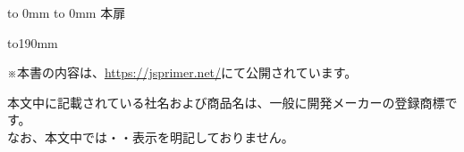 \begin{comment}
%
%
\end{comment}

\thispagestyle{empty} \vbox to 0mm{\vspace*{-27.5truemm} \hbox to 0mm{
}\vss} 本扉 \pagebreak


\begin{comment}
%
%
\end{comment}

\thispagestyle{frontheadings}

\vbox to190mm{ \vfil
\begin{minipage}[b]{112mm}
%
\begin{spacing}{1.0}
※本書の内容は、\url{https://jsprimer.net/}にて公開されています。

\begin{small}
本文中に記載されている社名および商品名は、一般に開発メーカーの登録商標です。\\
なお、本文中では\texttrademark ・\textcopyright ・\textregistered 表示を明記しておりません。
\end{small}
\end{spacing}
\end{minipage}
}
